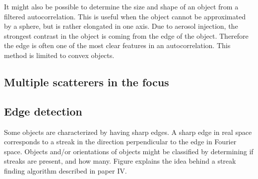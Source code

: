 It might also be possible to determine the size and shape of an object from a filtered autocorrelation. This is useful when the object cannot be approximated by a sphere, but is rather elongated in one axis. Due to aerosol injection, the strongest contrast in the object is coming from the edge of the object. Therefore the edge is often one of the most clear features in an autocorrelation. This method is limited to convex objects.

\subsection{Multiple scatterers in the focus}


\subsection{Edge detection}
Some objects are characterized by having sharp edges. A sharp edge in real space corresponds to a streak in the direction perpendicular to the edge in Fourier space. Objects and/or orientations of objects might be classified by determining if streaks are present, and how many. Figure explains the idea behind a streak finding algorithm described in paper IV.
